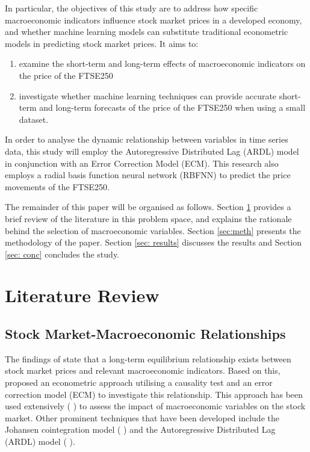 \documentclass[11pt,a4paper]{article}
\newcommand{\citeboth}[1]{\citeauthor{#1} \citep{#1}}
\begin{document}
In particular, the objectives of this study are to address how specific macroeconomic indicators influence stock market prices in a developed economy, and whether machine learning models can substitute traditional econometric models in predicting stock market prices. It aims to:
\begin{enumerate}
    \item examine the short-term and long-term effects of macroeconomic indicators on the price of the FTSE250
    \item investigate whether machine learning techniques can provide accurate short-term and long-term forecasts of the price of the FTSE250 when using a small dataset.
\end{enumerate}

In order to analyse the dynamic relationship between variables in time series data, this study
will employ the Autoregressive Distributed Lag (ARDL) model in conjunction with an Error
Correction Model (ECM). This research also employs a radial basis function neural network
(RBFNN) to predict the price movements of the FTSE250.

The remainder of this paper will be organised as follows. 
Section \ref{sec:lit} provides a brief review of the literature in this problem space, and explains the rationale behind the selection of macroeconomic variables.
Section \ref{sec:meth} presents the methodology of the paper. Section \ref{sec: results} discusses the results and Section \ref{sec: conc} concludes
the study.

\section{Literature Review}
\label{sec:lit}

\subsection{Stock Market-Macroeconomic Relationships}

The findings of \citeboth{ChenRollRoss1986} state that a long-term equilibrium relationship 
exists between stock market prices and relevant macroeconomic indicators. Based on this, 
\citeboth{EngleGranger1987} proposed an econometric approach utilising a causality test and an 
error correction model (ECM) to investigate this relationship. This approach has been used extensively (\citeboth{QuadriMasih, Plíhal2016,olomu2015}) to assess the impact of macroeconomic variables on the stock market. 
Other prominent techniques that have been developed include the Johansen cointegration model (\citeboth{YadavKheraMishra2021,Ozcan2012,ChistiShakeelGanai2020}) and the Autoregressive Distributed Lag (ARDL) model (\citeboth{khan2018,demir2019,neifar2023}).
\end{document}
